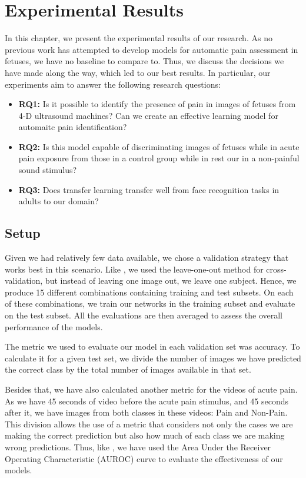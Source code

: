 \chapter{Experimental Results}

In this chapter, we present the experimental results of our research. As no previous work has attempted to develop models for automatic pain assessment in fetuses, we have no baseline to compare to. Thus, we discuss the decisions we have made along the way, which led to our best results. In particular, our experiments aim to answer the following research questions:

\begin{itemize}
    \item \textbf{RQ1:} Is it possible to identify the presence of pain in images of fetuses from 4-D ultrasound machines? Can we create an effective learning model for automaitc pain identification?
    
    \item \textbf{RQ2:} Is this model capable of discriminating images of fetuses while in acute pain exposure from those in a control group while in rest our in a non-painful sound stimulus?
    
    \item \textbf{RQ3:} Does transfer learning transfer well from face recognition tasks in adults to our domain?
\end{itemize}

\section{Setup}

Given we had relatively few data available, we chose a validation strategy that works best in this scenario. Like \cite{CelonaM17}, we used the leave-one-out method for cross-validation, but instead of leaving one image out, we leave one subject. Hence, we produce 15 different combinations containing training and test subsets. On each of these combinations, we train our networks in the training subset and evaluate on the test subset. All the evaluations are then averaged to assess the overall performance of the models.

The metric we used to evaluate our model in each validation set was accuracy. To calculate it for a given test set, we divide the number of images we have predicted the correct class by the total number of images available in that set.

Besides that, we have also calculated another metric for the videos of acute pain. As we have 45 seconds of video before the acute pain stimulus, and 45 seconds after it, we have images from both classes in these videos: Pain and Non-Pain.  This division allows the use of a metric that considers not only the cases we are making the correct prediction but also how much of each class we are making wrong predictions. Thus, like \cite{abs-1807-01631}, we have used the Area Under the Receiver Operating Characteristic (AUROC) curve to evaluate the effectiveness of our models.

